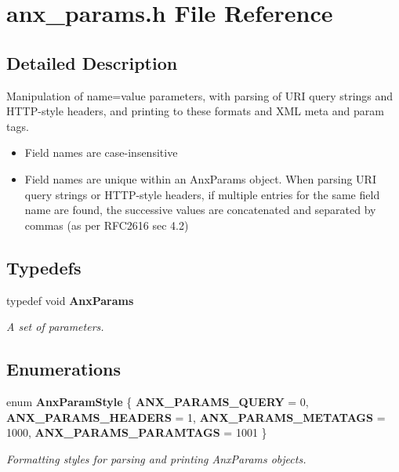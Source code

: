 \section{anx\_\-params.h File Reference}
\label{anx__params_8h}


\subsection{Detailed Description}
Manipulation of name=value parameters, with parsing of URI query strings and HTTP-style headers, and printing to these formats and XML meta and param tags. 

\begin{itemize}
\item Field names are case-insensitive\item Field names are unique within an Anx\-Params object. When parsing URI query strings or HTTP-style headers, if multiple entries for the same field name are found, the successive values are concatenated and separated by commas (as per RFC2616 sec 4.2)\end{itemize}


\subsection*{Typedefs}
\begin{CompactItemize}
\item 
typedef void {\bf Anx\-Params}
\begin{CompactList}\small\item\em A set of parameters. \item\end{CompactList}\end{CompactItemize}
\subsection*{Enumerations}
\begin{CompactItemize}
\item 
enum {\bf Anx\-Param\-Style} \{ {\bf ANX\_\-PARAMS\_\-QUERY} =  0, 
{\bf ANX\_\-PARAMS\_\-HEADERS} =  1, 
{\bf ANX\_\-PARAMS\_\-METATAGS} =  1000, 
{\bf ANX\_\-PARAMS\_\-PARAMTAGS} =  1001
 \}
\begin{CompactList}\small\item\em Formatting styles for parsing and printing Anx\-Params objects. \item\end{CompactList}\end{CompactItemize}

